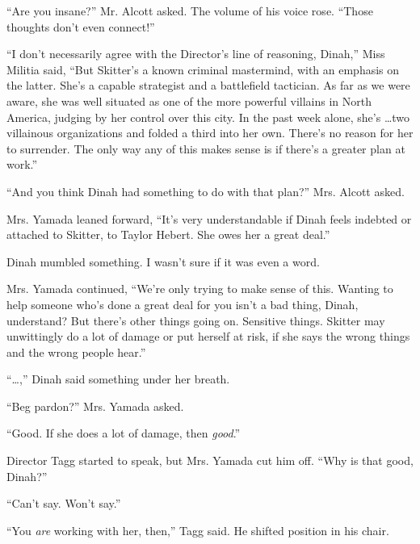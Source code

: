 ``Are you insane?'' Mr. Alcott asked.  The volume of his voice rose.  ``Those thoughts don't even connect!''



``I don't necessarily agree with the Director's line of reasoning, Dinah,'' Miss Militia said, ``But Skitter's a known criminal mastermind, with an emphasis on the latter.  She's a capable strategist and a battlefield tactician.  As far as we were aware, she was well situated as one of the more powerful villains in North America, judging by her control over this city.  In the past week alone, she's \ldots two villainous organizations and folded a third into her own.  There's no reason for her to surrender.  The only way any of this makes sense is if there's a greater plan at work.''



``And you think Dinah had something to do with that plan?''  Mrs. Alcott asked.



Mrs. Yamada leaned forward, ``It's very understandable if Dinah feels indebted or attached to Skitter, to Taylor Hebert.  She owes her a great deal.''



Dinah mumbled something.  I wasn't sure if it was even a word.



Mrs. Yamada continued, ``We're only trying to make sense of this.  Wanting to help someone who's done a great deal for you isn't a bad thing, Dinah, understand?  But there's other things going on.  Sensitive things.  Skitter may unwittingly do a lot of damage or put herself at risk, if she says the wrong things and the wrong people hear.''



``\ldots,'' Dinah said something under her breath.



``Beg pardon?'' Mrs. Yamada asked.



``Good.  If she does a lot of damage, then \emph{good}.''



Director Tagg started to speak, but Mrs. Yamada cut him off.  ``Why is that good, Dinah?''



``Can't say.  Won't say.''



``You \emph{are} working with her, then,'' Tagg said.  He shifted position in his chair.



